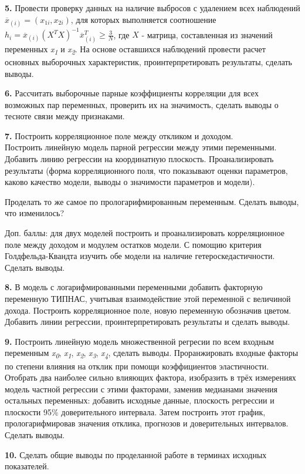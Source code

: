 \documentclass[
]{book}
\begin{document}
\textbf{5.} Провести проверку данных на наличие выбросов с удалением всех наблюдений \(\overline{x}_{(i)}=(x_{1i},x_{2i})\), для которых выполняется соотношение \(h_{i}=\overline{x}_{(i)}(X^{T}X)^{-1}\overline{x}_{(i)}^{T}\geqslant \frac{3}{N}\), где \(X\) - матрица, составленная из значений переменных \emph{x}\textsubscript{\emph{1}} и \emph{x}\textsubscript{\emph{2}}. На основе оставшихся наблюдений провести расчет основных выборочных характеристик, проинтерпретировать результаты, сделать выводы.

\textbf{6.} Рассчитать выборочные парные коэффициенты корреляции для всех возможных пар переменных, проверить их на значимость, сделать выводы о тесноте связи между признаками.

\textbf{7.} Построить корреляционное поле между откликом и доходом.\\
Построить линейную модель парной регрессии между этими переменными. Добавить линию регрессии на координатную плоскость. Проанализировать результаты (форма корреляционного поля, что показывают оценки параметров, каково качество модели, выводы о значимости параметров и модели).

Проделать то же самое по прологарифмированным переменным. Сделать выводы, что изменилось?

Доп. баллы: для двух моделей построить и проанализировать корреляционное поле между доходом и модулем остатков модели. С помощию критерия Голдфельда-Квандта изучить обе модели на наличие гетероскедастичности. Сделать выводы.

\textbf{8.} В модель с логарифмированными переменными добавить факторную переменную ТИПНАС, учитывая взаимодействие этой переменной с величиной дохода. Построить корреляционное поле, новую переменную обозначив цветом. Добавить линии регрессии, проинтерпретировать результаты и сделать выводы.

\textbf{9.} Построить линейную модель множественной регресии по всем входным переменным \emph{x}\textsubscript{\emph{0}}, \emph{x}\textsubscript{\emph{1}}, \emph{x}\textsubscript{\emph{2}}, \emph{x}\textsubscript{\emph{3}}, \emph{x}\textsubscript{\emph{4}}, сделать выводы. Проранжировать входные факторы по степени влияния на отклик при помощи коэффициентов эластичности. Отобрать два наиболее сильно влияющих фактора, изобразить в трёх измерениях модель частной регрессии с этими факторами, заменив медианами значения остальных переменных: добавить исходные данные, плоскость регрессии и плоскости 95\% доверительного интервала. Затем построить этот график, прологарифмировав значения отклика, прогнозов и доверительных интервалов. Сделать выводы.

\textbf{10.} Сделать общие выводы по проделанной работе в терминах исходных показателей.

  
\end{document}
